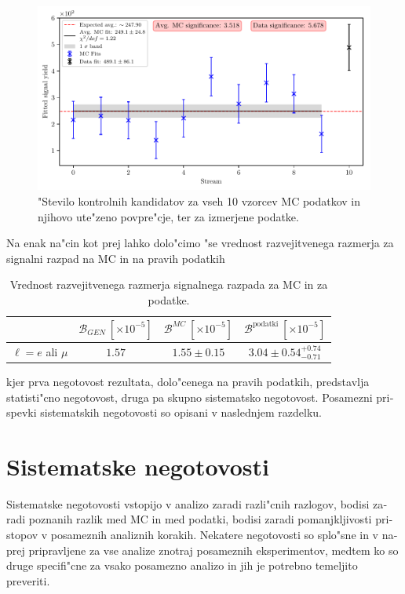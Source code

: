 \begin{otherlanguage}{slovene}
\begin{figure}[H]
	\centering
	\captionsetup{width=0.8\linewidth}
	\includegraphics[width=\linewidth]{fig/sig_global}
	\caption{"Stevilo kontrolnih kandidatov za vseh 10 vzorcev MC podatkov in njihovo ute"zeno povpre"cje, ter za izmerjene podatke.}
	\label{fig:sig_global_si}
\end{figure}

Na enak na"cin kot prej lahko dolo"cimo "se vrednost razvejitvenega razmerja za signalni razpad na MC in na pravih podatkih

\begin{table}[H]
	\centering
	\begin{tabular}{l|c|c|c}
		& $\mathcal{B}_{GEN}~[\times 10^{-5}]$ & $\mathcal{B}^{MC}~[\times 10^{-5}]$ & $\mathcal{B}^{\mathrm{podatki}}~[\times 10^{-5}]$ \\
		\toprule
		$\ell = e$ ali $\mu$ & $1.57$ & $1.55 \pm 0.15$ & $3.04 \pm 0.54 {}^{+0.74}_{-0.71}$\\
		\bottomrule
	\end{tabular}
	\captionsetup{width=.8\linewidth}
	\caption{Vrednost razvejitvenega razmerja signalnega razpada za MC in za podatke.}
\label{tab:br_result_sig_si}
\end{table}

kjer prva negotovost rezultata, dolo"cenega na pravih podatkih, predstavlja statisti"cno negotovost, druga pa skupno sistematsko negotovost. Posamezni prispevki sistematskih negotovosti so opisani v naslednjem razdelku.

\section{Sistematske negotovosti}

Sistematske negotovosti vstopijo v analizo zaradi razli"cnih razlogov, bodisi zaradi poznanih razlik med MC in med podatki, bodisi zaradi pomanjkljivosti pristopov v posameznih analiznih korakih. Nekatere negotovosti so splo"sne in v naprej pripravljene za vse analize znotraj posameznih eksperimentov, medtem ko so druge specifi"cne za vsako posamezno analizo in jih je potrebno temeljito preveriti. 


\end{otherlanguage}
